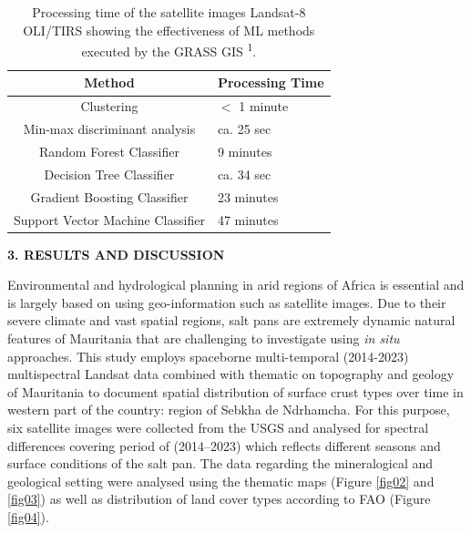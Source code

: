 \documentclass[12pt,a4paper,oneside]{article}
\def \newsection{\vspace{12pt}\textbf}
\def \newpar{\vspace{6pt}}
\begin{document}
\begin{table}[H]
\small
\caption{Processing time of the satellite images Landsat-8 OLI/TIRS showing the effectiveness of ML methods executed by the GRASS GIS \textsuperscript{1}.\label{tab2}}
\begin{tabularx}{\textwidth}{cp{4cm}}
			\toprule
			\textbf{Method} & \textbf{Processing Time} \\
			\midrule
			Clustering & $<$ 1 minute \\
			Min-max discriminant analysis & ca. 25 sec \\
			Random Forest Classifier & 9 minutes  \\
			Decision Tree Classifier & ca. 34 sec \\
			Gradient Boosting Classifier & 23 minutes  \\
			Support Vector Machine Classifier & 47 minutes  \\
			\bottomrule
\end{tabularx}
\end{table}

\newsection {3. RESULTS AND DISCUSSION}

\newpar Environmental and hydrological planning in arid regions of Africa is essential and is largely based on using geo-information such as satellite images. Due to their severe climate and vast spatial regions, salt pans are extremely dynamic natural features of Mauritania that are challenging to investigate using \emph{in situ} approaches. This study employs spaceborne multi-temporal (2014-2023) multispectral Landsat data combined with thematic on topography and geology of Mauritania to document spatial distribution of surface crust types over time in western part of the country: region of Sebkha de Ndrhamcha. For this purpose, six satellite images were collected from the USGS and analysed for spectral differences covering period of (2014--2023) which reflects different seasons and surface conditions of the salt pan. The data regarding the mineralogical and geological setting were analysed using the thematic maps (Figure \ref{fig02} and \ref{fig03}) as well as distribution of land cover types according to FAO (Figure \ref{fig04}).
\end{document}
